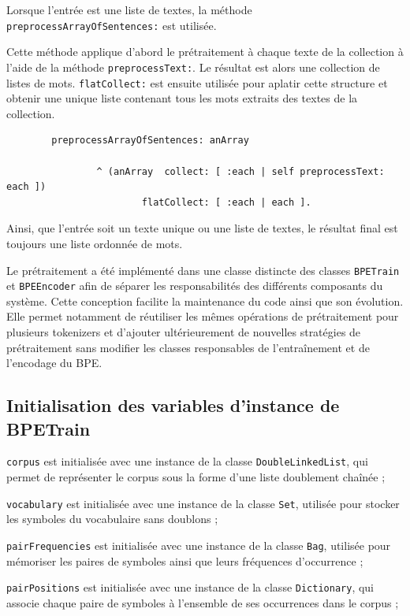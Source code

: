 \documentclass[12pt,a4paper]{report}
\begin{document}
	Lorsque l'entrée est une liste de textes, la méthode \texttt{preprocessArrayOfSentences:} est utilisée.
	
	Cette méthode applique d'abord le prétraitement à chaque texte de la collection à l'aide de la méthode \texttt{preprocessText:}. Le résultat est alors une collection de listes de mots. \texttt{flatCollect:} est ensuite utilisée pour aplatir cette structure et obtenir une unique liste contenant tous les mots extraits des textes de la collection.
	
	\begin{verbatim}
		preprocessArrayOfSentences: anArray	
		
				^ (anArray  collect: [ :each | self preprocessText: each ])
						flatCollect: [ :each | each ].
	\end{verbatim}
	
	Ainsi, que l'entrée soit un texte unique ou une liste de textes, le résultat final est toujours une liste ordonnée de mots.
	
	Le prétraitement a été implémenté dans une classe distincte des classes \texttt{BPETrain} et \texttt{BPEEncoder} afin de séparer les responsabilités des différents composants du système. Cette conception facilite la maintenance du code ainsi que son évolution. Elle permet notamment de réutiliser les mêmes opérations de prétraitement pour plusieurs tokenizers et d'ajouter ultérieurement de nouvelles stratégies de prétraitement sans modifier les classes responsables de l'entraînement et de l'encodage du BPE.
	
	\subsection{Initialisation des variables d’instance de BPETrain}
	
	\texttt{corpus} est initialisée avec une instance de la classe \texttt{DoubleLinkedList}, qui permet de représenter le corpus sous la forme d'une liste doublement chaînée ;
	
	\texttt{vocabulary} est initialisée avec une instance de la classe \texttt{Set}, utilisée pour stocker les symboles du vocabulaire sans doublons ;
	
	\texttt{pairFrequencies} est initialisée avec une instance de la classe \texttt{Bag}, utilisée pour mémoriser les paires de symboles ainsi que leurs fréquences d'occurrence ;
	
	\texttt{pairPositions} est initialisée avec une instance de la classe \texttt{Dictionary}, qui associe chaque paire de symboles à l'ensemble de ses occurrences dans le corpus ;
	
\end{document}
